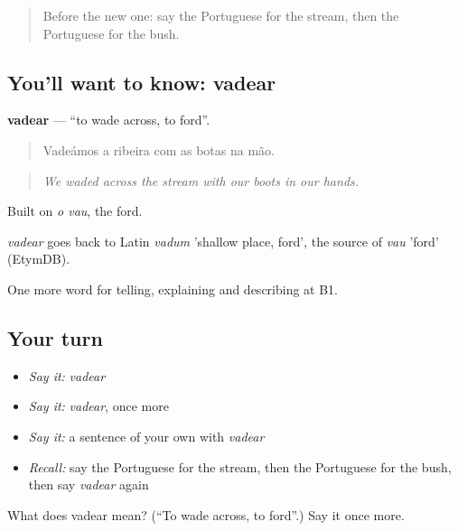 \label{lesson:PT-C456-vadear}



\begin{quote}
Before the new one: say the Portuguese for the stream, then the Portuguese for the bush.
\end{quote}

\subsection*{You'll want to know: vadear}
\textbf{vadear} — \textquotedblleft{}to wade across, to ford\textquotedblright{}.

\begin{quote}
Vadeámos a ribeira com as botas na mão.
\end{quote}

\begin{quote}
\emph{We waded across the stream with our boots in our hands.}
\end{quote}

Built on \emph{o vau}, the ford.

\begin{cousinweb}
\emph{vadear} goes back to Latin \emph{vadum} 'shallow place, ford', the source of \emph{vau} 'ford' (EtymDB).
\end{cousinweb}

\begin{grammarlens}[title={What you've built}]
One more word for telling, explaining and describing at B1.
\end{grammarlens}

\subsection*{Your turn}
\begin{itemize}
\raggedright
  \item \emph{Say it:} \emph{vadear}
  \item \emph{Say it:} \emph{vadear}, once more
  \item \emph{Say it:} a sentence of your own with \emph{vadear}
  \item \emph{Recall:} say the Portuguese for the stream, then the Portuguese for the bush, then say \emph{vadear} again
\end{itemize}

\begin{tcolorbox}[breakable,colback=teal!4,colframe=teal!35!black,title={Before you move on}]
What does vadear mean? (\textquotedblleft{}To wade across, to ford\textquotedblright{}.) Say it once more.
\end{tcolorbox}
